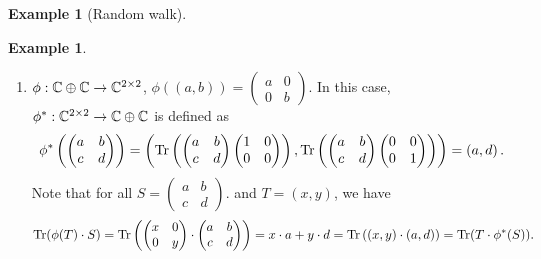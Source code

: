 \documentclass[10pt,a4paper]{amsart}
\theoremstyle{definition}
\theoremstyle{definition}
\newtheorem{example}[definition]{Example}
\theoremstyle{definition}
\theoremstyle{definition}
\theoremstyle{definition}
\theoremstyle{definition}
\begin{document}
\begin{example}[Random walk]
\begin{example}
\begin{enumerate}
    \item $\phi: \mathbb{C} \oplus \mathbb{C} \to \mathbb{C}^{2 \times 2}$, $\phi((a,b))=\left(\begin{smallmatrix}
    a & 0 \\
    0 & b
  \end{smallmatrix}\right).$ 
  In this case, $\phi^*:\mathbb{C}^{2 \times 2} \to \mathbb{C} \oplus \mathbb{C}$ is defined as
    $$\phi^*\left( \begin{pmatrix}
    a & b \\
    c & d
    \end{pmatrix}\right) 
    = \left( \text{Tr}\left( \begin{pmatrix}
    a & b \\
    c & d
    \end{pmatrix}  \begin{pmatrix}
    1 & 0 \\
    0 & 0
    \end{pmatrix}\right),
     \text{Tr}\left( \begin{pmatrix}
    a & b \\
    c & d
    \end{pmatrix}  \begin{pmatrix}
    0 & 0 \\
    0 & 1
    \end{pmatrix}\right) \right)
    = \left(a,d\right).$$
    Note that for all $S= \left(\begin{smallmatrix}
    a & b \\
    c & d
  \end{smallmatrix}\right). $ and $T = (x,y)$, we have 
    $$\text{Tr}(\phi(T)\cdot S) =   \text{Tr}\left(\begin{pmatrix}
    x & 0 \\
    0 & y
    \end{pmatrix}\cdot \begin{pmatrix}
    a & b \\
    c & d
    \end{pmatrix}\right) = x\cdot a + y \cdot d = \text{Tr}\left( (x,y) \cdot (a,d)\right) = \text{Tr}(T\cdot \phi^*(S)). $$



\end{enumerate}
\end{example}
\end{example}
\end{document}
